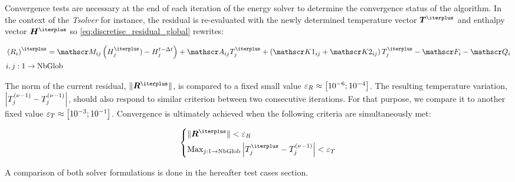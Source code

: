Convergence tests are necessary at the end of each iteration of the energy solver to determine 
the convergence status of the algorithm. In the context of the \emph{Tsolver} for instance, the residual 
is re-evaluated with the newly determined temperature vector $\vec{T^\iterplus}$ and enthalpy vector $\vec{H^\iterplus}$ so \cref{eq:discretise_residual_global} rewrites:

\begin{align}
\begin{split}
\label{eq:discretise_residual_global_new}
& \brac{R_i}^\iterplus = \Mij \brac{\Hj^\iterplus) - \Hjtminus} + \Aij \Tj^\iterplus + \brac{\Kija + \Kijb}\Tj^\iterplus -\Fi - \Qi \\
& i,j:1 \rightarrow \text{NbGlob}
\end{split}
\end{align}

The norm of the current residual, $\norm{\vec{R^\iterplus}}$, is compared to a fixed small 
value $\varepsilon_R \approx \crochet{\num{d-6};\num{d-4}}$. The resulting temperature variation, 
$\abval{\Tj^\iter-\Tj^\iterminus}$, should also respond to similar criterion between two consecutive 
iterations. For that purpose, we compare it to another fixed value $\varepsilon_T \approx \crochet{\num{d-3};\num{d-1}}$.
Convergence is ultimately achieved when the following criteria are simultaneously met:

\begin{equation}
\label{eq:energy_convergence_criteria}
   \left\{
   \begin{aligned}
      & \norm{\vec{R^\iterplus}} < \varepsilon_R \\
	  & \text{Max}_{j:1 \rightarrow \text{NbGlob}} \abval{\Tj^\iterplus-\Tj^\iter} < \varepsilon_T
    \end{aligned}
    \right.
\end{equation}

A comparison of both solver formulations is done in the hereafter test cases section.


